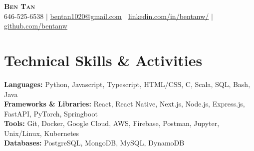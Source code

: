 \documentclass[letterpaper,11pt]{article}
\makeatletter
\newcommand{\resumeItem}[1]{
  \item\small{
    {#1 \vspace{-3pt}}
  }
}
\newcommand{\resumeSubheading}[4]{
  \vspace{-2pt}\item
    \begin{tabular*}{0.97\textwidth}[t]{l@{\extracolsep{\fill}}r}
      \textbf{#1} & #2 \\
      \textit{\small#3} & \textit{\small #4} \\
    \end{tabular*}\vspace{-7pt}
}
\newcommand{\resumeSubSubheading}[2]{
    \item
    \begin{tabular*}{0.97\textwidth}{l@{\extracolsep{\fill}}r}
      \textit{\small#1} & \textit{\small #2} \\
    \end{tabular*}\vspace{-7pt}
}
\newcommand{\resumeSubHeadingListStart}{\begin{itemize}[leftmargin=0.15in, label={}]}
\newcommand{\resumeSubHeadingListEnd}{\end{itemize}}
\newcommand{\resumeItemListStart}{\begin{itemize}}
\newcommand{\resumeItemListEnd}{\end{itemize}\vspace{-5pt}}
\makeatother
\begin{document}


\begin{center}
    \textbf{\LARGE \scshape Ben Tan} \\ \vspace{1pt}
    \small 646-525-6538 $|$ \href{}{\underline{bentan1020@gmail.com}} $|$ 
    \href{https://www.linkedin.com/in/bentanw/}
    {\underline{linkedin.com/in/bentanw/}} $|$
    \href{https://github.com/bentanw}
    {\underline{github.com/bentanw}}
\end{center}





%





\section{Technical Skills \& Activities}
 \begin{itemize}[leftmargin=0.15in, label={}]
    \small{\item{
      \textbf{Languages:} {Python, Javascript, Typescript, HTML/CSS, C, Scala, SQL, Bash, Java}\\
      \textbf{Frameworks \& Libraries:} {React, React Native, Next.js, Node.js, Express.js, FastAPI, PyTorch, Springboot}\\
      \textbf{Tools:} {Git, Docker, Google Cloud, AWS, Firebase, Postman, Jupyter, Unix/Linux, Kubernetes}\\
      \textbf{Databases:} {PostgreSQL, MongoDB, MySQL, DynamoDB}\\
    }}
 \end{itemize}
\end{document}
